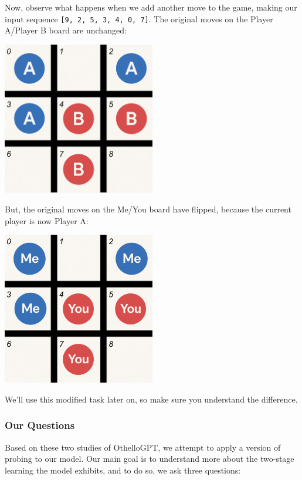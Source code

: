 \documentclass[11pt]{article}
\begin{document}
Now, observe what happens when we add another move to the game, making
our input sequence \texttt{{[}9,\ 2,\ 5,\ 3,\ 4,\ 0,\ 7{]}}. The
original moves on the Player A/Player B board are unchanged:

\begin{center}
\includegraphics[width=0.5\textwidth,keepaspectratio]{inserted_images/p1_p2_board_update_edit.png}
\end{center}

But, the original moves on the Me/You board have flipped, because the
current player is now Player A:

\begin{center}
\includegraphics[width=0.5\textwidth,keepaspectratio]{inserted_images/me_opp_board_update.png}
\end{center}

We'll use this modified task later on, so make sure you understand the
difference.

    \subsubsection{Our Questions}\label{our-questions}

Based on these two studies of OthelloGPT, we attempt to apply a version
of probing to our model. Our main goal is to understand more about the
two-stage learning the model exhibits, and to do so, we ask three
questions:
\end{document}
